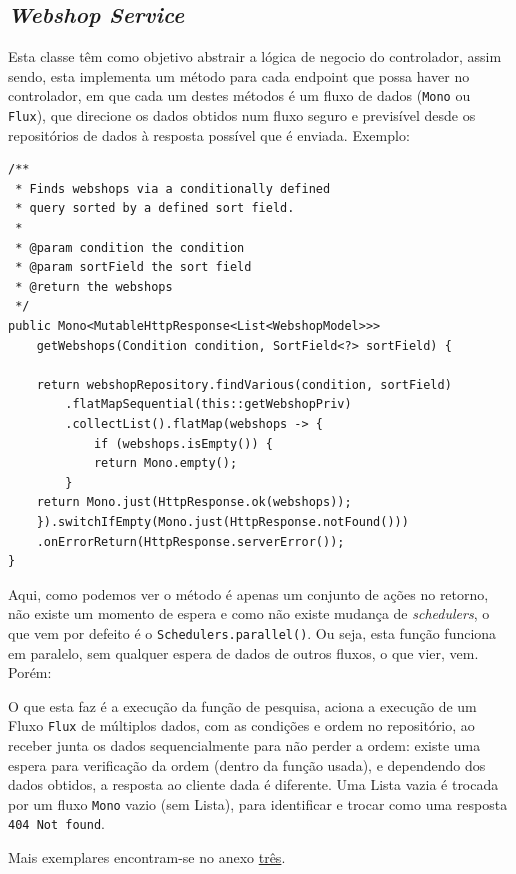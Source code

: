 \newpage

\subsection{\textit{Webshop Service}}

Esta classe têm como objetivo abstrair a lógica de negocio do controlador, assim sendo, esta implementa um método para cada endpoint que possa haver no controlador, em que cada um destes métodos é um fluxo de dados (\texttt{Mono} ou \texttt{Flux}), que direcione os dados obtidos num fluxo seguro e previsível desde os repositórios de dados à resposta possível que é enviada. Exemplo:

\begin{lstlisting}[frame=bt,numbers=none]
/**
 * Finds webshops via a conditionally defined
 * query sorted by a defined sort field.
 *
 * @param condition the condition
 * @param sortField the sort field
 * @return the webshops
 */
public Mono<MutableHttpResponse<List<WebshopModel>>>
    getWebshops(Condition condition, SortField<?> sortField) {

    return webshopRepository.findVarious(condition, sortField)
        .flatMapSequential(this::getWebshopPriv)
        .collectList().flatMap(webshops -> {
            if (webshops.isEmpty()) {
            return Mono.empty();
        }
    return Mono.just(HttpResponse.ok(webshops));
    }).switchIfEmpty(Mono.just(HttpResponse.notFound()))
    .onErrorReturn(HttpResponse.serverError());
}
\end{lstlisting}

Aqui, como podemos ver o método é apenas um conjunto de ações no retorno, não existe um momento de espera e como não existe mudança de \textit{schedulers}, o que vem por defeito é o \texttt{Schedulers.parallel()}. Ou seja, esta função funciona em paralelo, sem qualquer espera de dados de outros fluxos, o que vier, vem. Porém:

O que esta faz é a execução da função de pesquisa, aciona a execução de um Fluxo \texttt{Flux} de múltiplos dados, com as condições e ordem no repositório, ao receber junta os dados sequencialmente para não perder a ordem: existe uma espera para verificação da ordem (dentro da função usada), e dependendo dos dados obtidos, a resposta ao cliente dada é diferente. Uma Lista vazia é trocada por um fluxo \texttt{Mono} vazio (sem Lista), para identificar e trocar como uma resposta \texttt{404 Not found}.

Mais exemplares encontram-se no anexo \hyperref[an3]{três}.

